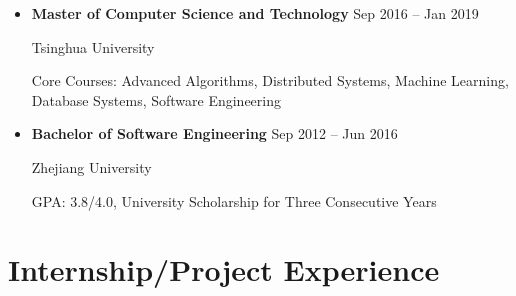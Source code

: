 \documentclass[11pt,a4paper]{article}
\begin{document}
\begin{itemize}
    \item \textbf{Master of Computer Science and Technology} \hfill Sep 2016 -- Jan 2019

    \textcolor{primarycolor}{Tsinghua University}

    \vspace{0.05em}

    Core Courses: Advanced Algorithms, Distributed Systems, Machine Learning, Database Systems, Software Engineering

    \vspace{0.15em}

    \item \textbf{Bachelor of Software Engineering} \hfill Sep 2012 -- Jun 2016

    \textcolor{primarycolor}{Zhejiang University}

    \vspace{0.05em}

    GPA: 3.8/4.0, University Scholarship for Three Consecutive Years
\end{itemize}

\section*{\faBriefcase\quad Internship/Project Experience}
\end{document}
